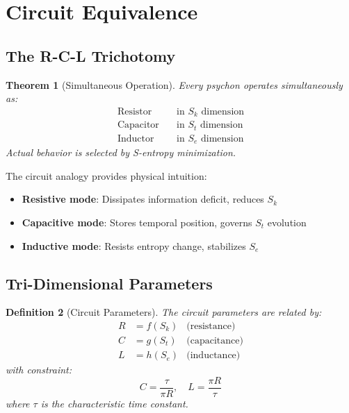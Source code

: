 \documentclass[twocolumn,amsmath,amssymb,aps,prl,superscriptaddress]{revtex4-2}
\newtheorem{theorem}{Theorem}[section]
\newtheorem{definition}[theorem]{Definition}
\newcommand{\Sk}{S_k}
\newcommand{\St}{S_t}
\newcommand{\Se}{S_e}
\begin{document}
\section{Circuit Equivalence}
\label{sec:circuits}

\subsection{The R-C-L Trichotomy}

\begin{theorem}[Simultaneous Operation]
\label{thm:rcl}
Every psychon operates simultaneously as:
\begin{align}
\text{Resistor} &\quad \text{in } \Sk \text{ dimension} \\
\text{Capacitor} &\quad \text{in } \St \text{ dimension} \\
\text{Inductor} &\quad \text{in } \Se \text{ dimension}
\end{align}
Actual behavior is selected by S-entropy minimization.
\end{theorem}

The circuit analogy provides physical intuition:
\begin{itemize}
\item \textbf{Resistive mode}: Dissipates information deficit, reduces $\Sk$
\item \textbf{Capacitive mode}: Stores temporal position, governs $\St$ evolution
\item \textbf{Inductive mode}: Resists entropy change, stabilizes $\Se$
\end{itemize}

\subsection{Tri-Dimensional Parameters}

\begin{definition}[Circuit Parameters]
The circuit parameters are related by:
\begin{align}
R &= f(\Sk) & \text{(resistance)} \\
C &= g(\St) & \text{(capacitance)} \\
L &= h(\Se) & \text{(inductance)}
\end{align}
with constraint:
\begin{equation}
C = \frac{\tau}{\pi R}, \quad L = \frac{\pi R}{\tau}
\end{equation}
where $\tau$ is the characteristic time constant.
\end{definition}
\end{document}
